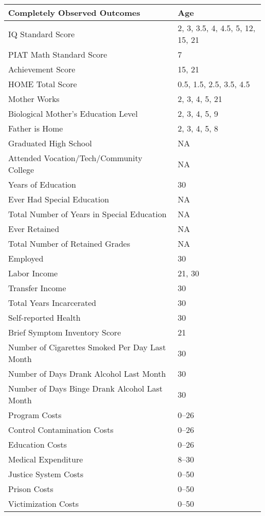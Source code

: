 \begin{tabular}{l l}
\toprule
Completely Observed Outcomes	&	Age	\\
\midrule			
IQ Standard Score	&			2, 3, 3.5, 4, 4.5, 5, 12, 15, 21	\\
PIAT Math Standard Score	&	7	\\
Achievement Score & 			15, 21 \\
HOME Total Score	&			0.5, 1.5, 2.5, 3.5, 4.5	\\
Mother Works	&				2, 3, 4, 5, 21	\\
Biological Mother's Education Level	&	2, 3, 4, 5, 9	\\
Father is Home	&				2, 3, 4, 5, 8	\\
Graduated High School	&		NA	\\
Attended Vocation/Tech/Community College	&	NA	\\
Years of Education	&	30	\\
Ever Had Special Education 			& NA \\
Total Number of Years in Special Education 	& NA \\
Ever Retained						& NA \\
Total Number of Retained Grades			& NA \\
Employed	&	30	\\
Labor Income &  21, 30 \\
Transfer Income &  30 \\
Total Years Incarcerated	&	30	\\
Self-reported Health	&	30	\\
Brief Symptom Inventory Score & 21 \\
Number of Cigarettes Smoked Per Day Last Month	&	30	\\
Number of Days Drank Alcohol Last Month	&	30	\\
Number of Days Binge Drank Alcohol Last Month	&	30	\\
Program Costs	&	0--26	\\
Control Contamination Costs	&	0--26	\\
Education Costs	&	0--26	\\
Medical Expenditure &	8--30	\\
Justice System Costs	&	0--50	\\
Prison Costs	&	0--50	\\
Victimization Costs	&	0--50	\\
\bottomrule			
\end{tabular}